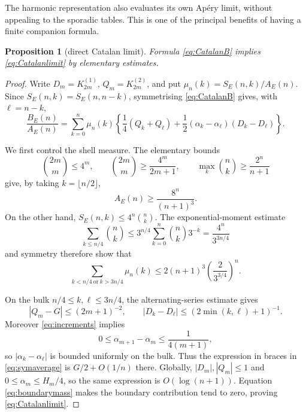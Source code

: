 \documentclass[11pt]{article}
\newtheorem{proposition}[theorem]{Proposition}
\theoremstyle{definition}
\theoremstyle{remark}
\begin{document}
The harmonic representation also evaluates its own Ap\'ery limit, without appealing to
the sporadic tables.  This is one of the principal benefits of having a finite companion
formula.

\begin{proposition}[direct Catalan limit]\label{prop:directlimit}
Formula \eqref{eq:CatalanB} implies \eqref{eq:Catalanlimit} by elementary estimates.
\end{proposition}

\begin{proof}
Write $D_m=K_{2m}^{(1)}$, $Q_m=K_{2m}^{(2)}$, and put
$\mu_n(k)=S_E(n,k)/A_E(n)$.  Since $S_E(n,k)=S_E(n,n-k)$, symmetrising
\eqref{eq:CatalanB} gives, with $\ell=n-k$,
\begin{equation}\label{eq:symaverage}
 \frac{B_E(n)}{A_E(n)}=
 \sum_{k=0}^n\mu_n(k)\left\{
 \frac14(Q_k+Q_\ell)
 +\frac12(\alpha_k-\alpha_\ell)(D_k-D_\ell)\right\}.
\end{equation}

We first control the shell measure.  The elementary bounds
\[
 \binom{2m}{m}\le4^m,\qquad
 \binom{2m}{m}\ge\frac{4^m}{2m+1},\qquad
 \max_k\binom nk\ge\frac{2^n}{n+1}
\]
give, by taking $k=\lfloor n/2\rfloor$,
\begin{equation}\label{eq:Alower}
 A_E(n)\ge\frac{8^n}{(n+1)^3}.
\end{equation}
On the other hand, $S_E(n,k)\le4^n\binom nk$.  The exponential-moment estimate
\[
 \sum_{k\le n/4}\binom nk
 \le 3^{n/4}\sum_{k=0}^n\binom nk3^{-k}
 =\frac{4^n}{3^{3n/4}}
\]
and symmetry therefore show that
\begin{equation}\label{eq:boundarymass}
 \sum_{k<n/4\ \mathrm{or}\ k>3n/4}\mu_n(k)
 \le2(n+1)^3\left(\frac{2}{3^{3/4}}\right)^n.
\end{equation}

On the bulk $n/4\le k,\ell\le3n/4$, the alternating-series estimate gives
\begin{equation}\label{eq:alternatingbounds}
 |Q_m-G|\le(2m+1)^{-2},\qquad
 |D_k-D_\ell|\le(2\min(k,\ell)+1)^{-1}.
\end{equation}
Moreover \eqref{eq:increments} implies
\[
 0\le\alpha_{m+1}-\alpha_m\le\frac1{4(m+1)},
\]
so $|\alpha_k-\alpha_\ell|$ is bounded uniformly on the bulk.  Thus the expression in
braces in \eqref{eq:symaverage} is $G/2+O(1/n)$ there.  Globally,
$|D_m|,|Q_m|\le1$ and $0\le\alpha_m\le H_m/4$, so the same expression is
$O(\log(n+1))$.  Equation \eqref{eq:boundarymass} makes the boundary contribution tend
to zero, proving \eqref{eq:Catalanlimit}.
\end{proof}
\end{document}
